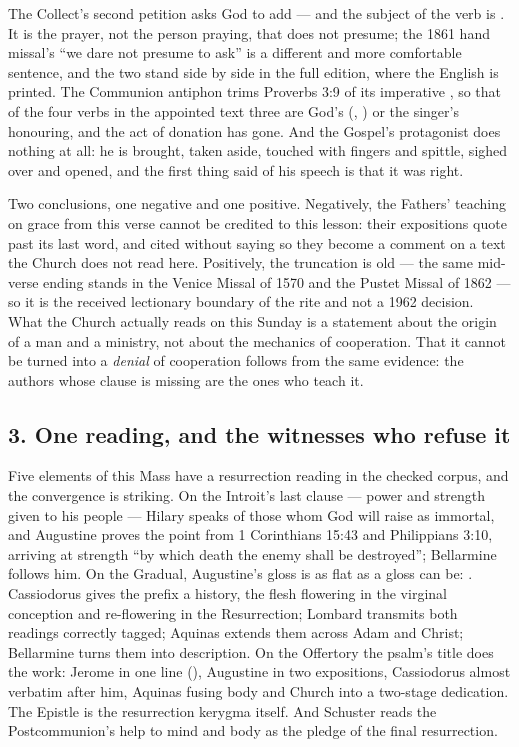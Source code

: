 The Collect's second petition asks God to add  --- and the subject of the verb is . It is the prayer,
not the person praying, that does not presume; the 1861 hand missal's ``we dare
not presume to ask'' is a different and more comfortable sentence, and the
two stand side by side in the full edition, where the English is printed. The Communion antiphon
trims Proverbs 3:9 of its imperative , so that of the four verbs
in the appointed text three are God's (,
) or the singer's honouring, and the act of donation has
gone. And the Gospel's protagonist does nothing at all: he is brought, taken
aside, touched with fingers and spittle, sighed over and opened, and the first
thing said of his speech is that it was right.

Two conclusions, one negative and one positive. Negatively, the Fathers'
teaching on grace from this verse cannot be credited to this lesson: their
expositions quote past its last word, and cited without saying so they become
a comment on a text the Church does not read here.
Positively, the truncation is old --- the same mid-verse ending stands in the
Venice Missal of 1570 and the Pustet Missal of 1862 --- so it is the received
lectionary boundary of the rite and not a 1962 decision. What the Church
actually reads on this Sunday is a statement about the origin of a man and a
ministry, not about the mechanics of cooperation. That it cannot be turned into
a \textit{denial} of cooperation follows from the same evidence: the authors
whose clause is missing are the ones who teach it.

\subsection*{3. One reading, and the witnesses who refuse it}

Five elements of this Mass have a resurrection reading in the checked corpus,
and the convergence is striking. On the
Introit's last clause --- power and strength given to his people --- Hilary
speaks of those whom God will raise as immortal, and Augustine proves the point
from 1 Corinthians 15:43 and Philippians 3:10, arriving at strength ``by which
death the enemy shall be destroyed''; Bellarmine follows him. On the Gradual,
Augustine's gloss is as flat as a gloss can be: . Cassiodorus gives the prefix a history, the
flesh flowering in the virginal conception and re-flowering in the
Resurrection; Lombard transmits both readings correctly tagged; Aquinas extends
them across Adam and Christ; Bellarmine turns them into description. On the
Offertory the psalm's title does the work: Jerome in one line
(), Augustine
in two expositions, Cassiodorus almost verbatim after him, Aquinas fusing body
and Church into a two-stage dedication. The Epistle is the resurrection
kerygma itself. And Schuster reads the Postcommunion's help to mind and body as
the pledge of the final resurrection.

